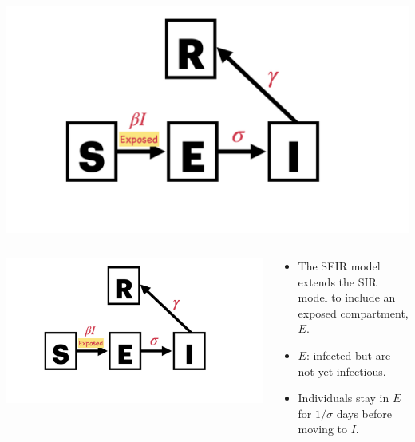 \documentclass[
  ignorenonframetext,
]{beamer}
\providecommand{\tightlist}{%
  \setlength{\itemsep}{0pt}\setlength{\parskip}{0pt}}\usepackage{longtable,booktabs,array}
\begin{document}
\begin{frame}
\includegraphics{images/model_diagrams/model_diagrams.007.jpeg}
\end{frame}

\begin{frame}
\begin{columns}[T]
\begin{column}{0.5\textwidth}
\includegraphics{images/model_diagrams/model_diagrams.007.jpeg}
\end{column}

\begin{column}{0.5\textwidth}
\begin{itemize}
\tightlist
\item
  The SEIR model extends the SIR model to include an exposed
  compartment, {\(E\)}.
\item
  {\(E\)}: infected but are not yet infectious.
\item
  Individuals stay in {\(E\)} for {\(1/\sigma\)} days before moving to
  \(I\).
\end{itemize}
\end{column}
\end{columns}
\end{frame}
\end{document}
